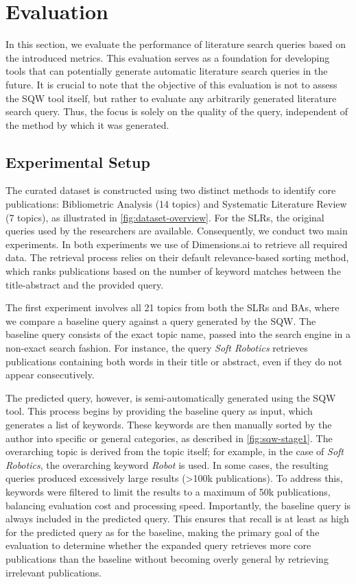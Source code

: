 \chapter{Evaluation}\label{ch:eval}
In this section, we evaluate the performance of literature search queries based on the introduced metrics. This evaluation serves as a foundation for developing tools that can potentially generate automatic literature search queries in the future. It is crucial to note that the objective of this evaluation is not to assess the SQW tool itself, but rather to evaluate any arbitrarily generated literature search query. Thus, the focus is solely on the quality of the query, independent of the method by which it was generated.

\section{Experimental Setup}

The curated dataset is constructed using two distinct methods to identify core publications: Bibliometric Analysis (14 topics) and Systematic Literature Review (7 topics), as illustrated in \autoref{fig:dataset-overview}. For the SLRs, the original queries used by the researchers are available. Consequently, we conduct two main experiments. In both experiments we use of Dimensions.ai to retrieve all required data. The retrieval process relies on their default relevance-based sorting method, which ranks publications based on the number of keyword matches between the title-abstract and the provided query.

The first experiment involves all 21 topics from both the SLRs and BAs, where we compare a baseline query against a query generated by the SQW. The baseline query consists of the exact topic name, passed into the search engine in a non-exact search fashion. For instance, the query \textit{Soft Robotics} retrieves publications containing both words in their title or abstract, even if they do not appear consecutively.

The predicted query, however, is semi-automatically generated using the SQW tool. This process begins by providing the baseline query as input, which generates a list of keywords. These keywords are then manually sorted by the author into specific or general categories, as described in \autoref{fig:sqw-stage1}. The overarching topic is derived from the topic itself; for example, in the case of \textit{Soft Robotics}, the overarching keyword \textit{Robot} is used. In some cases, the resulting queries produced excessively large results (>100k publications). To address this, keywords were filtered to limit the results to a maximum of 50k publications, balancing evaluation cost and processing speed. Importantly, the baseline query is always included in the predicted query. This ensures that recall is at least as high for the predicted query as for the baseline, making the primary goal of the evaluation to determine whether the expanded query retrieves more core publications than the baseline without becoming overly general by retrieving irrelevant publications.

